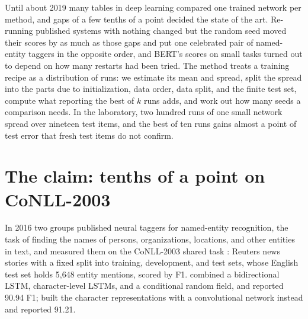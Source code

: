 \newcommand{\seedsMS}[1]{\mathrm{MS}_{#1}}
\begin{refsection}

\begin{chaptersummary}
Until about 2019 many tables in deep learning compared one trained network per method, and gaps of a few tenths of a point decided the state of the art. Re-running published systems with nothing changed but the random seed moved their scores by as much as those gaps and put one celebrated pair of named-entity taggers in the opposite order, and BERT's scores on small tasks turned out to depend on how many restarts had been tried. The method treats a training recipe as a distribution of runs: we estimate its mean and spread, split the spread into the parts due to initialization, data order, data split, and the finite test set, compute what reporting the best of $k$ runs adds, and work out how many seeds a comparison needs. In the laboratory, two hundred runs of one small network spread over nineteen test items, and the best of ten runs gains almost a point of test error that fresh test items do not confirm.
\end{chaptersummary}

\section{The claim: tenths of a point on CoNLL-2003}\label{sec:seeds:claim}

In 2016 two groups published neural taggers for named-entity recognition, the task of finding the names of persons, organizations, locations, and other entities in text, and measured them on the CoNLL-2003 shared task \parencite{TjongKimSangDeMeulder2003}: Reuters news stories with a fixed split into training, development, and test sets, whose English test set holds 5,648 entity mentions, scored by F1. \Textcite{LampleEtAl2016} combined a bidirectional LSTM, character-level LSTMs, and a conditional random field, and reported 90.94 F1; \textcite{MaHovy2016} built the character representations with a convolutional network instead and reported 91.21.


\end{refsection}
